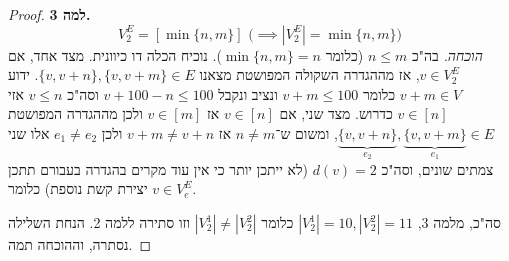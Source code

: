 \documentclass[]{article}
\newcommand\unquad {\!\!\!\!}
\begin{document}
\begin{proof}
		\textbf{למה 3. }
		\[ V_2^E = [\min\{n, m\}] \, \, \big(\unquad \implies |V_2^E| = \min\{n, m\}\big) \]
		\textit{הוכחה. }בה"כ $n \le m$ (כלומר $\min\{n, m\} = n$). נוכיח הכלה דו כיוונית. מצד אחד, אם $v \in V_2^E$, אז מההגדרה השקולה המפושטת מצאנו $\{v, v + n\}, \{v, v + m\} \in E$. ידוע $v + m \in V$ כלומר $v + m \le 100$ ונציב ונקבל $v + 100 - n \le 100$ וסה"כ $v \le n$ אזי $v \in [n]$ כדרוש. מצד שני, אם $v \in [n]$ אז $v \in [m]$ ולכן מההגדרה המפושטת $\underbrace{\{v, v + n\}}_{e_2},\underbrace{ \{v, v + m\} }_{e_1}\in E$, ומשום ש־$n \neq m$ אז $v + m \neq v + n$ ולכן $e_1 \neq e_2$ אלו שני צמתים שונים, וסה"כ $d(v) = 2$ (לא ייתכן יותר כי אין עוד מקרים בהגדרה בעבורם תתכן יצירת קשת נוספת) כלומר $v \in V_e^E$. 
		
		סה"כ, מלמה 3, $|V_2^1| = 10, |V_2^2| = 11$ כלומר $|V_2^1| \neq |V_2^2|$ וזו סתירה ללמה 2. הנחת השלילה נסתרה, וההוכחה תמה. 
	\end{proof}
	
\end{document}
